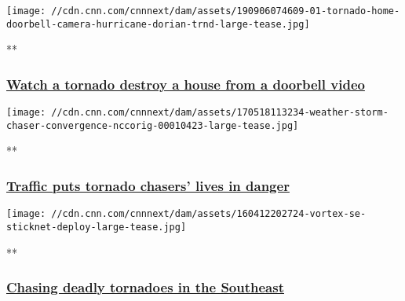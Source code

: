 \href{/videos/us/2019/09/06/hurricane-dorian-tornado-ring-doorbell-north-carolina-orig-js.cnn}{}

\texttt{[image: //cdn.cnn.com/cnnnext/dam/assets/190906074609-01-tornado-home-doorbell-camera-hurricane-dorian-trnd-large-tease.jpg]}

**

\hypertarget{watch-a-tornado-destroy-a-house-from-a-doorbell-video}{%
\subsubsection{\texorpdfstring{\href{/videos/us/2019/09/06/hurricane-dorian-tornado-ring-doorbell-north-carolina-orig-js.cnn}{Watch
a tornado destroy a house from a doorbell
video}}{Watch a tornado destroy a house from a doorbell video}}\label{watch-a-tornado-destroy-a-house-from-a-doorbell-video}}

\href{/videos/us/2017/05/18/weather-storm-chaser-convergence-nccorig.cnn}{}

\texttt{[image: //cdn.cnn.com/cnnnext/dam/assets/170518113234-weather-storm-chaser-convergence-nccorig-00010423-large-tease.jpg]}

**

\hypertarget{traffic-puts-tornado-chasers-lives-in-danger}{%
\subsubsection{\texorpdfstring{\href{/videos/us/2017/05/18/weather-storm-chaser-convergence-nccorig.cnn}{Traffic
puts tornado chasers' lives in
danger}}{Traffic puts tornado chasers' lives in danger}}\label{traffic-puts-tornado-chasers-lives-in-danger}}

\href{/videos/weather/2016/04/12/storm-chasing-in-the-southeast-weather-orig.cnn}{}

\texttt{[image: //cdn.cnn.com/cnnnext/dam/assets/160412202724-vortex-se-sticknet-deploy-large-tease.jpg]}

**

\hypertarget{chasing-deadly-tornadoes-in-the-southeast-}{%
\subsubsection{\texorpdfstring{\href{/videos/weather/2016/04/12/storm-chasing-in-the-southeast-weather-orig.cnn}{Chasing
deadly tornadoes in the Southeast
}}{Chasing deadly tornadoes in the Southeast }}\label{chasing-deadly-tornadoes-in-the-southeast-}}

